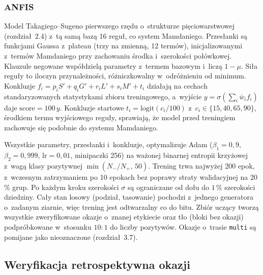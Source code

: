 \subsubsection{ANFIS}
Model Takagiego--Sugeno pierwszego rzędu o~strukturze pięciowarstwowej (rozdział~2.4) z~tą samą
bazą 16 reguł, co system Mamdaniego. Przesłanki są funkcjami Gaussa z~plateau (trzy na zmienną,
12 termów), inicjalizowanymi z~termów Mamdaniego przy zachowaniu środka i~szerokości połówkowej.
Klauzule negowane współdzielą parametry z~termem bazowym i~liczą $1-\mu$. Siła reguły to
iloczyn przynależności, różniczkowalny w~odróżnieniu od minimum. Konkluzje $f_i = p_i S' + q_i
G' + r_i L' + s_i M' + t_i$ działają na cechach standaryzowanych statystykami zbioru treningowego,
a~wyjście $y=\sigma(\sum_i \bar w_i f_i)$ daje $\mathrm{score}=100\,y$. Konkluzje startowe
$t_i=\mathrm{logit}(c_i/100)$ z~$c_i\in\{15,40,65,90\}$, środkiem termu wyjściowego reguły,
sprawiają, że model przed treningiem zachowuje się podobnie do systemu Mamdaniego.

Wszystkie parametry, przesłanki i~konkluzje, optymalizuje Adam ($\beta_1=0{,}9$,
$\beta_2=0{,}999$, $\mathrm{lr}=0{,}01$, minipaczki 256) na ważonej binarnej entropii krzyżowej
z~wagą klasy pozytywnej $\min(N_-/N_+,\,50)$. Trening trwa najwyżej 200 epok, z~wczesnym
zatrzymaniem po 10 epokach bez poprawy straty walidacyjnej na 20\,\% grup. Po każdym kroku
szerokości $\sigma$ są ograniczane od dołu do $1\,\%$ szerokości dziedziny. Cały stan losowy
(podział, tasowanie) pochodzi z~jednego generatora o~zadanym ziarnie, więc trening jest
odtwarzalny co do bitu. Zbiór uczący tworzą wszystkie zweryfikowane okazje o~znanej etykiecie
oraz tło (bloki bez okazji) podpróbkowane w~stosunku $10:1$ do liczby pozytywów. Okazje
o~trasie \texttt{multi} są pomijane jako nieoznaczone (rozdział~3.7).

\subsection{Weryfikacja retrospektywna okazji}

